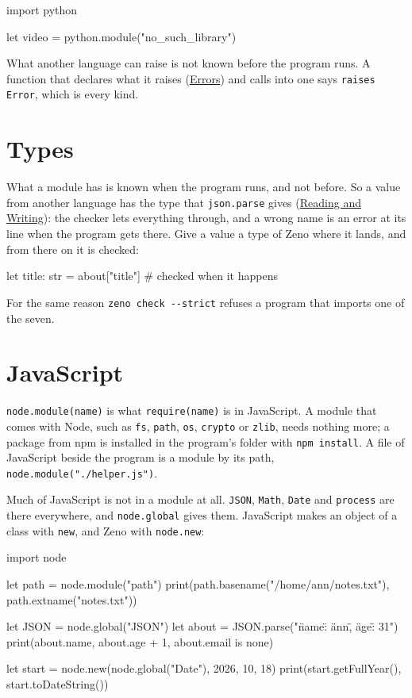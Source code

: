 \begin{zeno}[file=missing.zeno, dir=python, fails=yes]
import python

let video = python.module("no_such_library")
\end{zeno}

What another language can raise is not known before the program runs.
A function that declares what it raises (\hyperref[ch-errors]{Errors})
and calls into one says \verb|raises Error|, which is every kind.

\section{Types}

What a module has is known when the program runs, and not before. So
a value from another language has the type that \verb|json.parse|
gives (\hyperref[ch-reading-writing]{Reading and Writing}): the checker
lets everything through, and a wrong name is an error at its line when
the program gets there. Give a value a type of Zeno where it lands,
and from there on it is checked:

\begin{zenofrag}
let title: str = about["title"]       # checked when it happens
\end{zenofrag}

For the same reason \verb|zeno check --strict| refuses a program that
imports one of the seven.

\section{JavaScript}

\verb|node.module(name)| is what \verb|require(name)| is in
JavaScript. A module that comes with Node, such as \verb|fs|,
\verb|path|, \verb|os|, \verb|crypto| or \verb|zlib|, needs nothing
more; a package from npm is installed in the program's folder with
\verb|npm install|. A file of JavaScript beside the program is a
module by its path, \verb|node.module("./helper.js")|.

Much of JavaScript is not in a module at all. \verb|JSON|,
\verb|Math|, \verb|Date| and \verb|process| are there everywhere, and
\verb|node.global| gives them. JavaScript makes an object of a class
with \verb|new|, and Zeno with \verb|node.new|:

\begin{zeno}[file=globals.zeno]
import node

let path = node.module("path")
print(path.basename("/home/ann/notes.txt"), path.extname("notes.txt"))

let JSON = node.global("JSON")
let about = JSON.parse("{\"name\": \"ann\", \"age\": 31}")
print(about.name, about.age + 1, about.email is none)

let start = node.new(node.global("Date"), 2026, 10, 18)
print(start.getFullYear(), start.toDateString())
\end{zeno}

